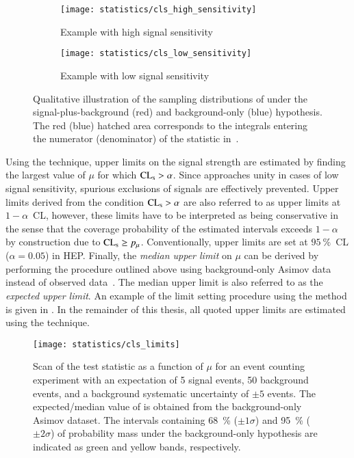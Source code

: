 \begin{figure}[htbp]
  \centering

  \begin{subfigure}{0.46\textwidth}
    \texttt{[image: statistics/cls\_high\_sensitivity]}
    \caption{Example with high signal sensitivity}
  \end{subfigure}\hfill%
  \begin{subfigure}{0.46\textwidth}
    \texttt{[image: statistics/cls\_low\_sensitivity]}
    \caption{Example with low signal sensitivity}
  \end{subfigure}

  \caption{Qualitative illustration of the sampling distributions of \qmutilde
    under the signal-plus-background (red) and background-only (blue)
    hypothesis. The red (blue) hatched area corresponds to the integrals
    entering the numerator (denominator) of the \CLs statistic
    in~.}%
  \label{fig:cls_qmutilde}
\end{figure}

Using the \CLs technique, upper limits on the signal strength are estimated by
finding the largest value of $\mu$ for which $\text{CL}_{\text{s}} > \alpha$. Since \CLs
approaches unity in cases of low signal sensitivity, spurious exclusions of
signals are effectively prevented. Upper limits derived from the condition
$\text{CL}_{\text{s}} > \alpha$ are also referred to as upper limits at $1 - \alpha$~CL,
however, these limits have to be interpreted as being conservative in the sense
that the coverage probability of the estimated intervals exceeds $1 - \alpha$ by
construction due to $\text{CL}_{\text{s}} \geq p_\mu$. Conventionally, upper limits are set at
$\SI{95}{\percent}$~CL ($\alpha = 0.05$) in HEP.  Finally, the \emph{median
  upper limit} on $\mu$ can be derived by performing the procedure outlined
above using background-only Asimov data instead of observed
data~\cite{Cowan:2010js}. The median upper limit is also referred to as the
\emph{expected upper limit}. An example of the limit setting procedure using the
\CLs method is given in . In the remainder of this thesis,
all quoted upper limits are estimated using the \CLs technique.

\begin{figure}[htbp]
  \centering

  \texttt{[image: statistics/cls\_limits]}

  \caption{Scan of the \CLs test statistic as a function of $\mu$ for an event
    counting experiment with an expectation of 5 signal events, 50 background
    events, and a background systematic uncertainty of $\pm 5$ events. The
    expected/median value of \CLs is obtained from the background-only Asimov
    dataset. The \CLs intervals containing \SI{68}{\percent} ($\pm 1 \sigma$)
    and \SI{95}{\percent} ($\pm 2 \sigma$) of probability mass under the
    background-only hypothesis are indicated as green and yellow bands,
    respectively.}%
  \label{fig:cls_example}
\end{figure}


